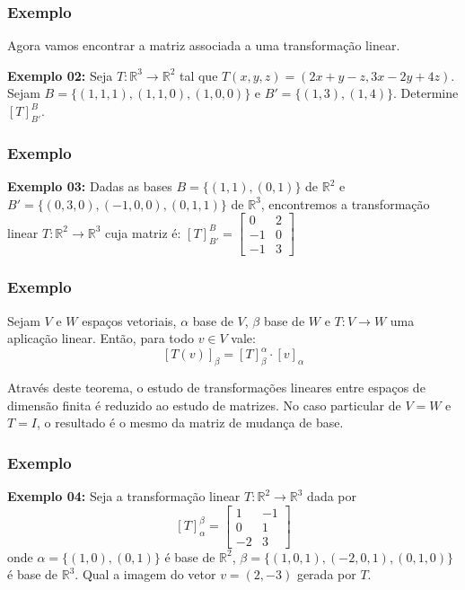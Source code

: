 \documentclass[hyperref={pdfpagelabels=false}]{beamer}
\begin{document}
\begin{frame}
\frametitle{Exemplo}
Agora vamos encontrar a matriz associada a uma transformação linear.

\pause

{\bf Exemplo 02:} Seja $T:\mathbb{R}^3 \rightarrow \mathbb{R}^2$ tal que $T(x,y,z) = (2x + y - z, 3x - 2y + 4z)$. Sejam $B = \{ (1,1,1), (1,1,0), (1,0,0) \}$ e $B' = \{ (1,3), (1,4) \}$. Determine $[T]_{B'}^{B}$.

\end{frame}

\begin{frame}
\frametitle{Exemplo}
{\bf Exemplo 03: }Dadas as bases $B = \{ (1,1), (0,1) \}$ de $\mathbb{R}^2$ e $B' = \{ (0,3,0), (-1,0,0), (0,1,1) \}$ de $\mathbb{R}^3$, encontremos a transformação linear $T: \mathbb{R}^2 \rightarrow \mathbb{R}^3$ cuja matriz é:
$[T]_{B'}^{B} = \left[
\begin{array}{cc}
0	&	2	\\
-1	&	0	\\
-1	&	3
\end{array}
\right]  $
\end{frame}

\begin{frame}
\frametitle{Exemplo}
\begin{theorem}
	Sejam $V$ e $W$ espaços vetoriais, $\alpha$ base de $V$, $\beta$ base de $W$ e $T: V \rightarrow W$ uma aplicação linear. Então, para todo $v \in V$ vale:
	$$[T(v)]_{\beta} = [T]_{\beta}^{\alpha} \cdot [v]_{\alpha}$$
\end{theorem}

\pause 

Através deste teorema, o estudo de transformações lineares entre espaços de dimensão finita é reduzido ao estudo de matrizes. No caso particular de $V = W$ e $T = I$, o resultado é o mesmo da matriz de mudança de base.


\end{frame}


\begin{frame}
\frametitle{Exemplo}

{\bf Exemplo 04:} Seja a transformação linear $T: \mathbb{R}^2 \rightarrow \mathbb{R}^3$ dada por
$$[T]_{\alpha}^{\beta} = \left[
\begin{array}{cc}
1	&	-1	\\
0	&	1	\\
-2	&	3
\end{array}
\right] 
$$
onde $\alpha = \{ (1,0), (0,1) \}$ é base de $\mathbb{R}^2$, $\beta = \{ (1,0,1), (-2,0,1), (0,1,0) \}$ é base de $\mathbb{R}^3$. Qual a imagem do vetor $v = (2,-3)$ gerada por $T$.


\end{frame}
\end{document}
